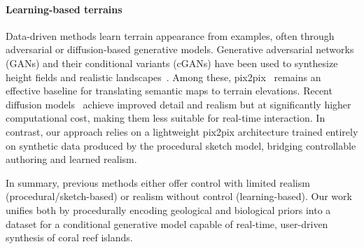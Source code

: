 \paragraph{Learning-based terrains}
Data-driven methods learn terrain appearance from examples, often through adversarial or diffusion-based generative models. Generative adversarial networks (GANs) and their conditional variants (cGANs) have been used to synthesize height fields and realistic landscapes~\cite{Goodfellow2014,WulffJensen2018,Spick2019,Guerin2017,Panagiotou2020,Beckham2017}. Among these, pix2pix~\cite{Isola2017} remains an effective baseline for translating semantic maps to terrain elevations. Recent diffusion models~\cite{Ho2020,Nichol2021,Lochner2023} achieve improved detail and realism but at significantly higher computational cost, making them less suitable for real-time interaction.  
In contrast, our approach relies on a lightweight pix2pix architecture trained entirely on synthetic data produced by the procedural sketch model, bridging controllable authoring and learned realism.

In summary, previous methods either offer control with limited realism (procedural/sketch-based) or realism without control (learning-based). Our work unifies both by procedurally encoding geological and biological priors into a dataset for a conditional generative model capable of real-time, user-driven synthesis of coral reef islands.








